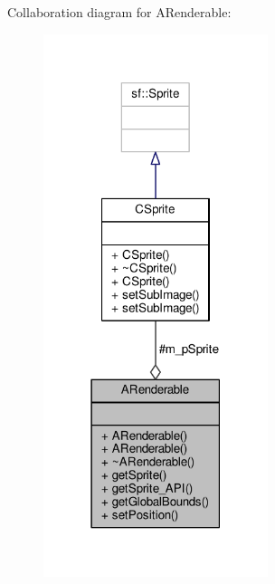 Collaboration diagram for A\-Renderable\-:\nopagebreak
\begin{figure}[H]
\begin{center}
\leavevmode
\includegraphics[width=186pt]{classARenderable__coll__graph}
\end{center}
\end{figure}
